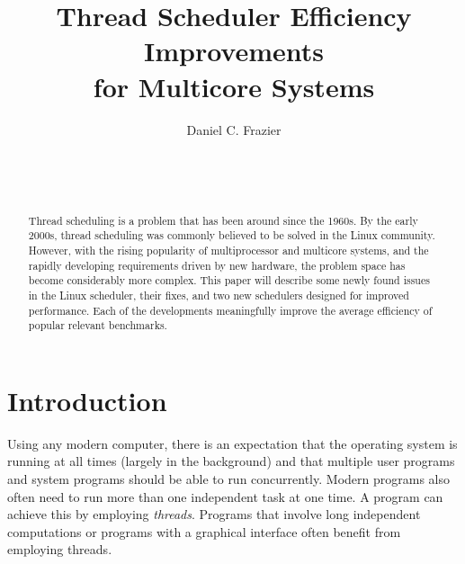 \documentclass{sig-alternate}
\begin{document}

\title{Thread Scheduler Efficiency Improvements \\ for Multicore Systems}


\author{
\alignauthor
Daniel C. Frazier\\
	\\
	\\
	\\
}
\maketitle

\begin{abstract}

Thread scheduling is a problem that has been around since the 1960s. By the early 2000s, thread scheduling was commonly believed to be solved in the Linux community. However, with the rising popularity of multiprocessor and multicore systems, and the rapidly developing requirements driven by new hardware, the problem space has become considerably more complex. This paper will describe some newly found issues in the Linux scheduler, their fixes, and two new schedulers designed for improved performance. Each of the developments meaningfully improve the average efficiency of popular relevant benchmarks.

\end{abstract}


\section{Introduction}
\label{sec:intro}

Using any modern computer, there is an expectation that the operating system is running at all times (largely in the background) and that multiple user programs and system programs should be able to run concurrently. Modern programs also often need to run more than one independent task at one time. A program can achieve this by employing \emph{threads}. Programs that involve long independent computations or programs with a graphical interface often benefit from employing threads.
\end{document}

